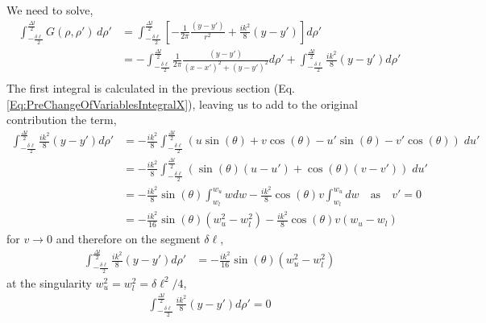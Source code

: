 \documentclass{article}
\newcommand{\0}{\varnothing}
\begin{document}
We need to solve,
\begin{align*}
    \int_{-\frac{\delta \ell}{2}}^{\frac{\Delta l}{2}} G(\rho,\rho')\, d\rho' &= 
    \int_{-\frac{\delta \ell}{2}}^{\frac{\Delta l}{2}} \left[ -\frac{1}{2 \pi } \frac{(y-y')}{r^2} + \frac{ik^2}{8}(y-y') \right] d\rho'\\
    &=   -\int_{-\frac{\delta \ell}{2}}^{\frac{\Delta l}{2}} \frac{1}{2 \pi } \frac{(y-y')}{(x-x')^2+(y-y')^2} d\rho' + \int_{-\frac{\delta \ell}{2}}^{\frac{\Delta l}{2}} \frac{ik^2}{8}(y-y')  d\rho'\\
\end{align*}
The first integral is calculated in the previous section (Eq. \eqref{Eq:PreChangeOfVariablesIntegralX}), leaving us to add to the original contribution the term,
\begin{align*}
    \int_{-\frac{\delta \ell}{2}}^{\frac{\Delta l}{2}} \frac{ik^2}{8}(y-y')  d\rho' 
    &= -\frac{ik^2}{8} \int_{-\frac{\delta \ell}{2}}^{\frac{\Delta l}{2}} \left( u\sin(\theta) + v\cos(\theta) 
                                  - u'\sin(\theta) - v'\cos(\theta) \right) \; du'\\
    &= -\frac{ik^2}{8} \int_{-\frac{\delta \ell}{2}}^{\frac{\Delta l}{2}} \left( \sin(\theta)(u-u') + \cos(\theta)(v-v') \right) \; du'\\    
    &= -\frac{ik^2}{8} \sin(\theta)\int_{w_l}^{w_u}  w dw - \frac{ik^2}{8} \cos(\theta)v \int_{w_l}^{w_u} dw \quad \text{as} \quad v' = 0 \\\textbf{}
    &= -\frac{ik^2}{16} \sin(\theta) \left( w_u^2 - w^2_l \right) - \frac{ik^2}{8} \cos(\theta)v (w_u-w_l)
\end{align*}
for $v \rightarrow 0$ and therefore on the segment $\delta \ell$,
\begin{align*}
    \int_{-\frac{\delta \ell}{2}}^{\frac{\Delta l}{2}} \frac{ik^2}{8}(y-y')  d\rho'  &= -\frac{ik^2}{16} \sin(\theta) \left( w_u^2 - w^2_l \right)
\end{align*}
at the singularity $w^2_u = w^2_l = \delta \ell^2/4$,
\begin{align*}
    \int_{-\frac{\delta \ell}{2}}^{\frac{\Delta l}{2}} \frac{ik^2}{8}(y-y')  d\rho' = 0
\end{align*}
\end{document}
